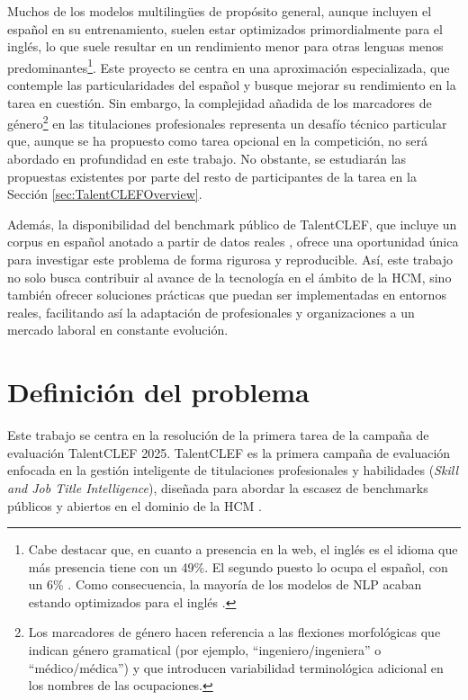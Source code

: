 Muchos de los modelos multilingües de propósito general, aunque incluyen el español en su entrenamiento, suelen estar optimizados primordialmente para el inglés, lo que suele resultar en un rendimiento menor para otras lenguas menos predominantes\footnote{Cabe destacar que, en cuanto a presencia en la web, el inglés es el idioma que más presencia tiene con un 49\%. El segundo puesto lo ocupa el español, con un 6\% \cite{w3techs2023usage}. Como consecuencia, la mayoría de los modelos de \gls{NLP} acaban estando optimizados para el inglés \cite{guo2025large}.}. Este proyecto se centra en una aproximación especializada, que contemple las particularidades del español y busque mejorar su rendimiento en la tarea en cuestión. Sin embargo, la complejidad añadida de los marcadores de género\footnote{Los marcadores de género hacen referencia a las flexiones morfológicas que indican género gramatical (por ejemplo, ``ingeniero/ingeniera'' o ``médico/médica'') y que introducen variabilidad terminológica adicional en los nombres de las ocupaciones.} en las titulaciones profesionales representa un desafío técnico particular que, aunque se ha propuesto como tarea opcional en la competición, no será abordado en profundidad en este trabajo. No obstante, se estudiarán las propuestas existentes por parte del resto de participantes de la tarea en la Sección \ref{sec:TalentCLEFOverview}.

Además, la disponibilidad del benchmark público de TalentCLEF, que incluye un corpus en español anotado a partir de datos reales \cite{gasco2025overview}, ofrece una oportunidad única para investigar este problema de forma rigurosa y reproducible. Así, este trabajo no solo busca contribuir al avance de la tecnología en el ámbito de la \gls{HCM}, sino también ofrecer soluciones prácticas que puedan ser implementadas en entornos reales, facilitando así la adaptación de profesionales y organizaciones a un mercado laboral en constante evolución.


\section{Definición del problema}
\label{sec:DefinicionDelProblema}

\noindent Este trabajo se centra en la resolución de la primera tarea de la campaña de evaluación TalentCLEF 2025. TalentCLEF es la primera campaña de evaluación enfocada en la gestión inteligente de titulaciones profesionales y habilidades (\textit{Skill and Job Title Intelligence}), diseñada para abordar la escasez de benchmarks públicos y abiertos en el dominio de la \gls{HCM} \cite{talentclefMotivation}.

